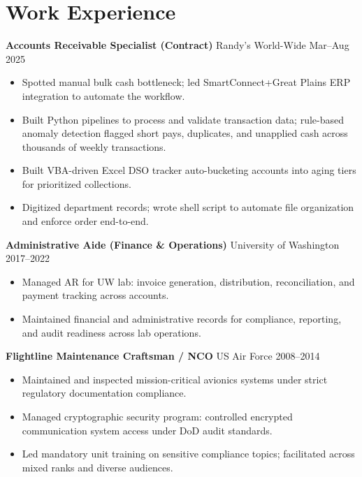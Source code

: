 \documentclass[11pt,a4paper]{article}
\begin{document}
\section*{Work Experience}

\noindent
\textbf{Accounts Receivable Specialist (Contract)} \hfill Randy's World-Wide \hfill Mar--Aug 2025
\begin{itemize}
    \item Spotted manual bulk cash bottleneck; led SmartConnect+Great Plains ERP integration to automate the workflow.
    \item Built Python pipelines to process and validate transaction data; rule-based anomaly detection flagged short pays, duplicates, and unapplied cash across thousands of weekly transactions.
    \item Built VBA-driven Excel DSO tracker auto-bucketing accounts into aging tiers for prioritized collections.
    \item Digitized department records; wrote shell script to automate file organization and enforce order end-to-end.
\end{itemize}

\vspace{0.2cm}
\noindent
\textbf{Administrative Aide (Finance \& Operations)} \hfill University of Washington \hfill 2017--2022
\begin{itemize}
    \item Managed AR for UW lab: invoice generation, distribution, reconciliation, and payment tracking across accounts.
    \item Maintained financial and administrative records for compliance, reporting, and audit readiness across lab operations.
\end{itemize}

\vspace{0.2cm}
\noindent
\textbf{Flightline Maintenance Craftsman / NCO} \hfill US Air Force \hfill 2008--2014
\begin{itemize}
    \item Maintained and inspected mission-critical avionics systems under strict regulatory documentation compliance.
    \item Managed cryptographic security program: controlled encrypted communication system access under DoD audit standards.
    \item Led mandatory unit training on sensitive compliance topics; facilitated across mixed ranks and diverse audiences.
\end{itemize}
\end{document}
